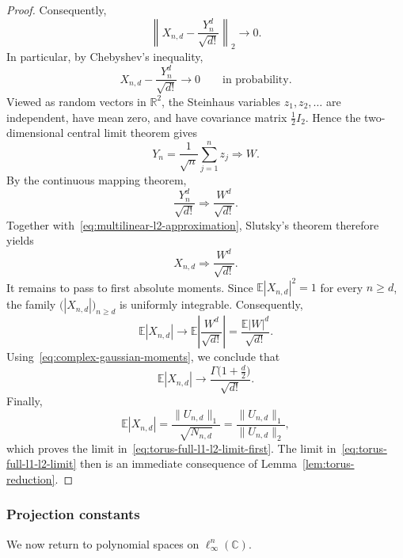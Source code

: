 \documentclass[11pt,showkeys]{amsart}
\begin{document}
\begin{proof}
Consequently,
\begin{equation}
\label{eq:multilinear-l2-approximation}
    \left\|
        X_{n,d}-\frac{Y_n^d}{\sqrt{d!}}
    \right\|_2
    \longrightarrow 0.
\end{equation}
In particular, by Chebyshev's inequality,
\[
    X_{n,d}-\frac{Y_n^d}{\sqrt{d!}}
    \longrightarrow 0
    \qquad\text{in probability}.
\]
Viewed as random vectors in \(\mathbb R^2\), the Steinhaus variables
\(z_1,z_2,\ldots\) are independent, have mean zero, and have covariance
matrix \(\frac12 I_2\). Hence the two-dimensional central limit theorem
gives
\[
    Y_n
    =
    \frac{1}{\sqrt n}\sum_{j=1}^n z_j
    \Longrightarrow W.
\]
By the continuous mapping theorem,
\[
    \frac{Y_n^d}{\sqrt{d!}}
    \Longrightarrow
    \frac{W^d}{\sqrt{d!}}.
\]
Together with~\eqref{eq:multilinear-l2-approximation}, Slutsky's theorem
therefore yields
\[
    X_{n,d}
    \Longrightarrow
    \frac{W^d}{\sqrt{d!}}.
\]
It remains to pass to first absolute moments. Since
\(\mathbb E|X_{n,d}|^2=1\) for every \(n\geq d\), the family
\(\bigl(|X_{n,d}|\bigr)_{n\geq d}\) is uniformly integrable.
Consequently,
\[
    \mathbb E|X_{n,d}|
    \longrightarrow
    \mathbb E\left|\frac{W^d}{\sqrt{d!}}\right|
    =
    \frac{\mathbb E|W|^d}{\sqrt{d!}}.
\]
Using~\eqref{eq:complex-gaussian-moments}, we conclude that
\[
    \mathbb E|X_{n,d}|
    \longrightarrow
    \frac{\Gamma\bigl(1+\frac d2\bigr)}{\sqrt{d!}}.
\]
Finally,
\[
    \mathbb E|X_{n,d}|
    =
    \frac{\|U_{n,d}\|_1}{\sqrt{N_{n,d}}}
    =
    \frac{\|U_{n,d}\|_1}{\|U_{n,d}\|_2},
\]
which proves the limit in~\eqref{eq:torus-full-l1-l2-limit-first}. The limit in~\eqref{eq:torus-full-l1-l2-limit} then is an immediate consequence of Lemma~\ref{lem:torus-reduction}.
\end{proof}


\subsubsection{Projection constants}\label{proof::torus-polynomial-projection-asymptotic}

We now return to polynomial spaces on \(\ell_\infty^n(\mathbb C)\).
\end{document}
